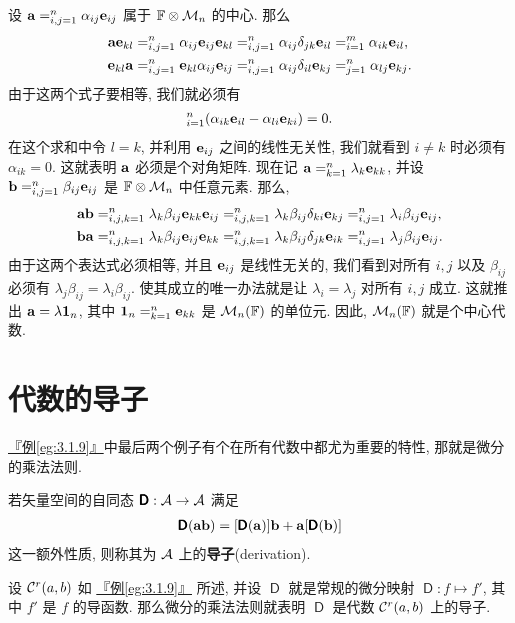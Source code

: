 \documentclass[lang=cn,zihao=-4,twoside,fontset=none]{textbook}
\makeatletter
\let\sum\relax
\newcommand{\bsf}[1]{{\mathop{\pmb{\mathsf{#1}}}}}
\def\eq#1{\[\begin{aligned}{}#1\end{aligned}\]}
\newcommand{\egref}[1]{\hyperref[#1]{『例\textnormal{\ref*{#1}}』}}
\newcommand{\bfid}{\mathbf{1}}
\newcommand{\addterm}[2]{\textbf{#1}{(#2)}\index[nidx]{#1@\textbf{#1}(#2)}}
\makeatother
\begin{document}
\begin{exam}
    \label{eg:3.3.3}%
    设 $\bfa=\sum_{i,j=1}^n\alpha_{ij}\bfe_{ij}$ 属于 ${\mathbb F}\otimes{\mathcal M}_n$ 的中心. 那么
    \eq{
        \bfa\bfe_{kl}&=\sum_{i,j=1}^n \alpha_{ij}\bfe_{ij}\bfe_{kl}=\sum_{i,j=1}^n\alpha_{ij}\delta_{jk}\bfe_{il}=\sum_{i=1}^m\alpha_{ik}\bfe_{il},\\
        \bfe_{kl}\bfa&=\sum_{i,j=1}^n \bfe_{kl}\alpha_{ij}\bfe_{ij}=\sum_{i,j=1}^n \alpha_{ij}\delta_{il}\bfe_{kj}=\sum_{j=1}^n\alpha_{lj}\bfe_{kj}.
    }
    由于这两个式子要相等, 我们就必须有 
    \eq{
        \sum_{i=1}^n(\alpha_{ik}\bfe_{il}-\alpha_{li}\bfe_{ki})=0.
    }
    在这个求和中令 $l=k$, 并利用 ${\mathbf e}_{ij}$ 之间的线性无关性, 我们就看到 $i\neq k$ 时必须有 $\alpha_{ik}=0$. 这就表明 ${\mathbf a}$ 必须是个对角矩阵. 现在记 $\bfa=\sum_{k=1}^n\lambda_k\bfe_{kk}$, 并设 $\bfb=\sum_{i,j=1}^n\beta_{ij}\bfe_{ij}$ 是 ${\mathbb F}\otimes{\mathcal M}_n$ 中任意元素. 那么,  
    \eq{
        \bfa\bfb&=\sum_{i,j,k=1}^n \lambda_k \beta_{ij}\bfe_{kk}\bfe_{ij}=\sum_{i,j,k=1}^n \lambda_k \beta_{ij}\delta_{ki}\bfe_{kj}=\sum_{i,j=1}^n\lambda_i\beta_{ij}\bfe_{ij},\\
        \bfb\bfa&=\sum_{i,j,k=1}^n \lambda_k\beta_{ij}\bfe_{ij}\bfe_{kk}=\sum_{i,j,k=1}^n \lambda_k\beta_{ij}\delta_{jk}\bfe_{ik}=\sum_{i,j=1}^n \lambda_j \beta_{ij} \bfe_{ij}.
    }
    由于这两个表达式必须相等, 并且 ${\mathbf e}_{ij}$ 是线性无关的, 我们看到对所有 $i,j$ 以及 $\beta_{ij}$ 必须有 $\lambda_j\beta_{ij}=\lambda_i\beta_{ij}$. 使其成立的唯一办法就是让 $\lambda_i=\lambda_j$ 对所有 $i,j$ 成立. 这就推出 $\bfa=\lambda\bfid_n$, 其中 $\bfid_n=\sum_{k=1}^n\bfe_{kk}$ 是 ${\mathcal M}_n({\mathbb F})$ 的单位元. 因此, ${\mathcal M}_n({\mathbb F})$ 就是个中心代数. 
\end{exam}


\newpage
\section{代数的导子}\label{sec:3.4}

\egref{eg:3.1.9}中最后两个例子有个在所有代数中都尤为重要的特性, 那就是微分的乘法法则. 

\begin{defi}
    [导子]\label{def:3.4.1}%
    若矢量空间的自同态 $\bsf{D}:\mA\to\mA$ 满足
    \eq{
        \bsf{D}(\bfa\bfb)=[\bsf{D}(\bfa)]\bfb+\bfa[\bsf{D}(\bfb)]
    }
    这一额外性质, 则称其为 ${\mathcal A}$ 上的\addterm{导子}{derivation}.
\end{defi}

\begin{exam}
    \label{eg:3.4.2}%
    设 ${\mathcal C}^r(a,b)$ 如 \egref{eg:3.1.9} 所述, 并设 $\bsf{D}$ 就是常规的微分映射 $\bsf{D}:f\mapsto f'$, 其中 $f'$ 是 $f$ 的导函数. 那么微分的乘法法则就表明 $\bsf{D}$ 是代数 ${\mathcal C}^r(a,b)$ 上的导子.
\end{exam}
\end{document}
